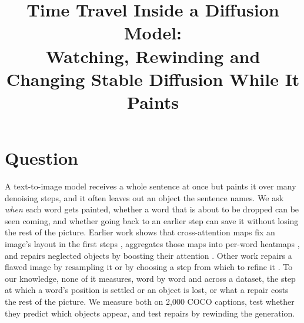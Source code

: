 \documentclass[conference]{IEEEtran}
\begin{document}
\title{Time Travel Inside a Diffusion Model:\\ Watching, Rewinding and Changing Stable Diffusion While It Paints}

\author{
}

\maketitle

\section{Question}
A text-to-image model receives a whole sentence at once but paints it over many denoising steps, and it often leaves out an object the sentence names. We ask \emph{when} each word gets painted, whether a word that is about to be dropped can be seen coming, and whether going back to an earlier step can save it without losing the rest of the picture. Earlier work shows that cross-attention maps fix an image's layout in the first steps \cite{p2p}, aggregates those maps into per-word heatmaps \cite{daam}, and repairs neglected objects by boosting their attention \cite{aae}. Other work repairs a flawed image by resampling it \cite{resample} or by choosing a step from which to refine it \cite{stepsel}. To our knowledge, none of it measures, word by word and across a dataset, the step at which a word's position is settled or an object is lost, or what a repair costs the rest of the picture. We measure both on 2{,}000 COCO captions, test whether they predict which objects appear, and test repairs by rewinding the generation.
\end{document}
